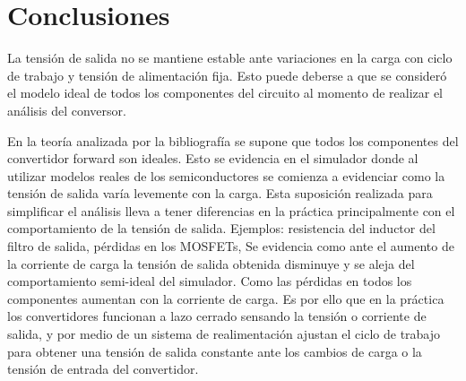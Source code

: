 \section{Conclusiones}


La tensión de salida no se mantiene estable ante variaciones en la carga con ciclo de trabajo y tensión de alimentación fija. 
Esto puede deberse a que se consideró el modelo ideal de todos los componentes del circuito al momento de realizar el análisis del conversor. 

En la teoría analizada por la bibliografía se supone que todos los componentes del convertidor forward son ideales. 
Esto se evidencia en el simulador donde al utilizar modelos reales de los semiconductores se comienza a evidenciar como la tensión de salida varía levemente con la carga. 
Esta suposición realizada para simplificar el análisis lleva a tener diferencias en la práctica principalmente con el comportamiento de la tensión de salida. 
Ejemplos: resistencia del inductor del filtro de salida, pérdidas en los MOSFETs,
Se evidencia como ante el aumento de la corriente de carga la tensión de salida obtenida disminuye y se aleja del comportamiento semi-ideal del simulador. 
Como las pérdidas en todos los componentes aumentan con la corriente de carga. 
Es por ello que en la práctica los convertidores funcionan a lazo cerrado sensando la tensión o corriente de salida, y por medio de un sistema de realimentación ajustan el ciclo de trabajo para obtener una tensión de salida constante ante los cambios de carga o la tensión de entrada del convertidor.